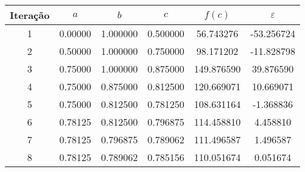 \begin{tabular}{cccccc}
\toprule
Iteração &     $a$ &      $b$ &      $c$ &     $f(c)$ & $\varepsilon$ \\
\midrule
       1 & 0.00000 & 1.000000 & 0.500000 &  56.743276 &    -53.256724 \\
       2 & 0.50000 & 1.000000 & 0.750000 &  98.171202 &    -11.828798 \\
       3 & 0.75000 & 1.000000 & 0.875000 & 149.876590 &     39.876590 \\
       4 & 0.75000 & 0.875000 & 0.812500 & 120.669071 &     10.669071 \\
       5 & 0.75000 & 0.812500 & 0.781250 & 108.631164 &     -1.368836 \\
       6 & 0.78125 & 0.812500 & 0.796875 & 114.458810 &      4.458810 \\
       7 & 0.78125 & 0.796875 & 0.789062 & 111.496587 &      1.496587 \\
       8 & 0.78125 & 0.789062 & 0.785156 & 110.051674 &      0.051674 \\
\bottomrule
\end{tabular}
